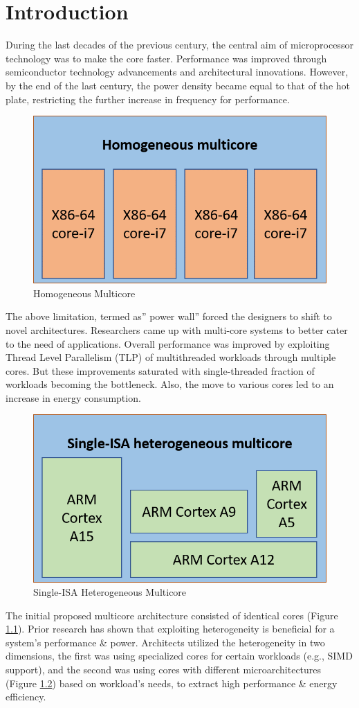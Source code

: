 \documentclass[a4paper,12pt, final]{report}
\begin{document}
\chapter{Introduction}
During the last decades of the previous century, the central aim of microprocessor technology was to make the core faster. Performance was improved through semiconductor technology advancements and architectural innovations. However, by the end of the last century, the power density became equal to that of the hot plate, restricting the further increase in frequency for performance. 
\begin{figure}[H]
    \centering
    \includegraphics[width=0.5\linewidth]{homogeneous-mc.png}
    \caption{Homogeneous Multicore}
    \label{homo-mc}
\end{figure}
\indent 
The above limitation, termed as” power wall” forced the designers to shift to novel architectures. Researchers came up with multi-core systems to better cater to the need of applications. Overall performance was improved by exploiting Thread Level Parallelism (TLP) of multithreaded workloads through multiple cores. But these improvements saturated with single-threaded fraction of workloads becoming the bottleneck\cite{oldamdahl}. Also, the move to various cores led to an increase in energy consumption.
\begin{figure}[H]
    \centering
    \includegraphics[width=0.5\linewidth]{single-isa-heterogeneous-mc.png}
    \caption{Single-ISA Heterogeneous Multicore}
    \label{sing-isa-hetero}
\end{figure}
\indent The initial proposed multicore architecture consisted of identical cores (Figure \ref{homo-mc}). Prior research has shown that exploiting heterogeneity is beneficial for a system's performance\cite{kumarheteroperf} \& power\cite{kumarheteropower}. Architects utilized the heterogeneity in two dimensions, the first was using specialized cores for certain workloads (e.g., SIMD support), and the second was using cores with different microarchitectures (Figure \ref{sing-isa-hetero}) based on workload's needs, to extract high performance \& energy efficiency.\\\\
\end{document}
